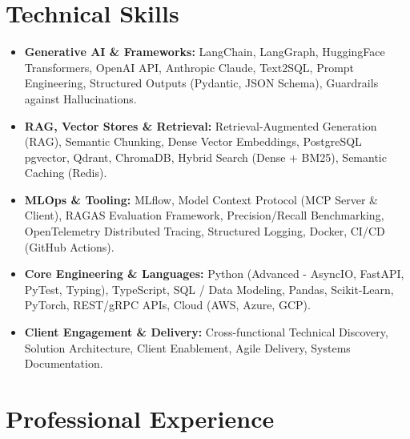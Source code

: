 \documentclass[a4paper,10pt]{article}
\begin{document}
\section{Technical Skills}
\begin{itemize}[leftmargin=1.2em, itemsep=2pt]
  \item \textbf{Generative AI \& Frameworks:} LangChain, LangGraph, HuggingFace Transformers, OpenAI API, Anthropic Claude, Text2SQL, Prompt Engineering, Structured Outputs (Pydantic, JSON Schema), Guardrails against Hallucinations.
  \item \textbf{RAG, Vector Stores \& Retrieval:} Retrieval-Augmented Generation (RAG), Semantic Chunking, Dense Vector Embeddings, PostgreSQL pgvector, Qdrant, ChromaDB, Hybrid Search (Dense + BM25), Semantic Caching (Redis).
  \item \textbf{MLOps \& Tooling:} MLflow, Model Context Protocol (MCP Server \& Client), RAGAS Evaluation Framework, Precision/Recall Benchmarking, OpenTelemetry Distributed Tracing, Structured Logging, Docker, CI/CD (GitHub Actions).
  \item \textbf{Core Engineering \& Languages:} Python (Advanced - AsyncIO, FastAPI, PyTest, Typing), TypeScript, SQL / Data Modeling, Pandas, Scikit-Learn, PyTorch, REST/gRPC APIs, Cloud (AWS, Azure, GCP).
  \item \textbf{Client Engagement \& Delivery:} Cross-functional Technical Discovery, Solution Architecture, Client Enablement, Agile Delivery, Systems Documentation.
\end{itemize}

\section{Professional Experience}
\end{document}
